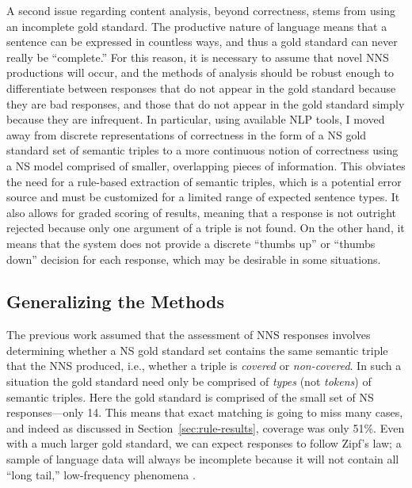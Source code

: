 A second issue regarding content analysis, beyond correctness, stems
from using an incomplete gold standard. The productive nature of language means that a sentence can be expressed in countless ways, and thus a gold standard can never really be ``complete.'' For this reason, it is necessary to assume that novel NNS productions will occur, and the methods of analysis should be robust enough to differentiate between responses that do not appear in the gold standard because they are bad responses, and those that do not appear in the gold standard simply because they are infrequent.
In particular, using available NLP tools, I moved away from discrete representations of correctness in the form of a NS gold standard set of semantic triples to a more continuous notion of correctness using a NS model comprised of smaller, overlapping pieces of information. This obviates the need for a rule-based extraction of semantic triples, which is a potential error source and must be customized for a limited range of expected sentence types. It also allows for graded scoring of results, meaning that a response is not outright rejected because only one argument of a triple is not found. On the other hand, it means that the system does not provide a discrete ``thumbs up'' or ``thumbs down'' decision for each response, which may be desirable in some situations. %


\subsection{Generalizing the Methods}
\label{sec:ranking}

The previous work assumed that the assessment of NNS responses
involves determining whether a NS gold standard set contains the same
semantic triple that the NNS produced, i.e., whether a triple
is \textit{covered} or \textit{non-covered}.  In such a situation the
gold standard need only be comprised of \textit{types} (not \textit{tokens}) of semantic triples. Here the gold standard is comprised of the small set of NS responses---only 14. This means that exact matching is going to miss many cases,
and indeed as discussed in Section~\ref{sec:rule-results}, coverage was only 51\%. Even with a much larger gold standard, we can expect responses to follow Zipf's law; a sample of language data will always be incomplete because it will not contain all ``long tail,'' low-frequency phenomena \cite{zipf2016human}.

